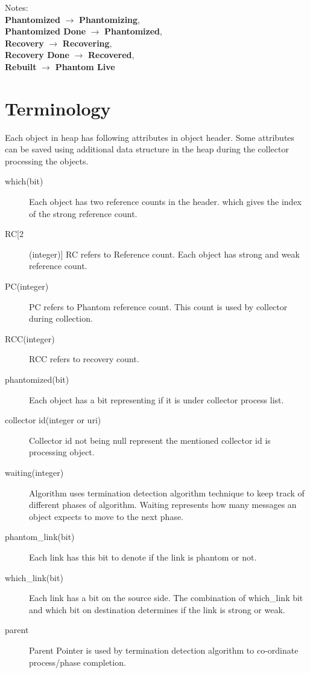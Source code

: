 \documentclass{article}
\begin{document}
Notes:\\
\textbf{Phantomized} $\rightarrow$ \textbf{Phantomizing},\\
\textbf{Phantomized Done} $\rightarrow$ \textbf{Phantomized},\\
\textbf{Recovery} $\rightarrow$ \textbf{Recovering},\\
\textbf{Recovery Done} $\rightarrow$ \textbf{Recovered},\\
\textbf{Rebuilt} $\rightarrow$ \textbf{Phantom Live}\\

\section{Terminology}
Each object in heap has following attributes in object header. Some attributes can be saved using additional data structure in the heap during the collector processing the objects. 
\begin{description}
  \item[which(bit)] Each object has two reference counts in the header. which gives the index of the strong reference count.
  \item[RC[2](integer)] RC refers to Reference count. Each object has strong and weak reference count.
  \item[PC(integer)] PC refers to Phantom reference count. This count is used by collector during collection.
  \item[RCC(integer)] RCC refers to recovery count.
  \item[phantomized(bit)] Each object has a bit representing if it is under collector process list.
  \item[collector id(integer or uri)] Collector id not being null represent the mentioned collector id is processing object.
  \item[waiting(integer)] Algorithm uses termination detection algorithm technique to keep track of different phases of algorithm. Waiting represents how many messages an object expects to move to the next phase.
  \item[phantom\_link(bit)] Each link has this bit to denote if the link is phantom or not.
  \item[which\_link(bit)] Each link has a bit on the source side. The combination of which\_link bit and which bit on destination determines if the link is strong or weak.
\item[parent] Parent Pointer is used by termination detection algorithm to co-ordinate process/phase completion.
\end{description}
\end{document}
